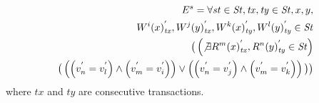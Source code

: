 \documentclass{sig-alternate-05-2015}
\begin{document}
  \begin{align}\label{eqn:PL1}
\begin{split}
 E^s = \forall  \mathit{st} \in \mathit{St}, \mathit{tx}, \mathit{ty} \in \mathit{St}, x, y,\\
  {W^i}(x)^{'}_\mathit{tx},  {W^j}(y)^{'}_\mathit{tx},
  {W^k}(x)^{'}_\mathit{ty}, {W^l}(y)^{'}_\mathit{ty} \in  \mathit{St} \\
  \big( \left( \not\exists {R^m}(x)^{'}_\mathit{tx}, {R^n}(y)^{'}_\mathit{ty} \in \mathit{St} \right) \\
\big( \left( \left( v_n^{'} = v_l^{'} \right) \wedge \left( v_m^{'} = v_i^{'} \right) \right) \vee \left( \left( v_n^{'} = v_j^{'} \right) \wedge \left( v_m^{'} = v_k^{'} \right) \right)  \big) \big)
\end{split}
  \end{align} where $\mathit{tx}$ and $\mathit{ty}$  are consecutive transactions.
\end{document}
